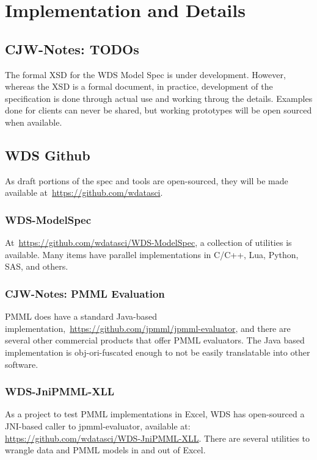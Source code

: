 \documentclass[10pt]{article}
\begin{document}
\fi

\section{Implementation and Details}

\ifcommentary
\subsection{CJW-Notes: TODOs}

The formal XSD for the WDS Model Spec is under development. However, whereas the XSD is a formal document, in practice, development of the
specification is done through actual use and working throug the details.  Examples done for clients can never be shared, but working 
prototypes will be open sourced when available.

\fi


\subsection{WDS Github}

As draft portions of the spec and tools are open-sourced, they will be made available at~\url{https://github.com/wdatasci}.

\subsubsection{WDS-ModelSpec}

At~\url{https://github.com/wdatasci/WDS-ModelSpec}, a collection of utilities is available.  Many items have parallel implementations in
C/C++, Lua, Python, SAS, and others.

\ifcommentary
\subsubsection{CJW-Notes:  PMML Evaluation}
PMML does have a standard Java-based implementation,~\url{https://github.com/jpmml/jpmml-evaluator}, and there are several other commercial products
that offer PMML evaluators.  The Java based implementation is obj-ori-fuscated enough to not be easily translatable into other
software.
\fi


\subsubsection{WDS-JniPMML-XLL}

As a project to test PMML implementations in Excel, WDS has open-sourced a JNI-based caller to jpmml-evaluator, available at:
\url{https://github.com/wdatasci/WDS-JniPMML-XLL}.
There are several utilities to wrangle data and PMML models in and out of Excel.
\end{document}
